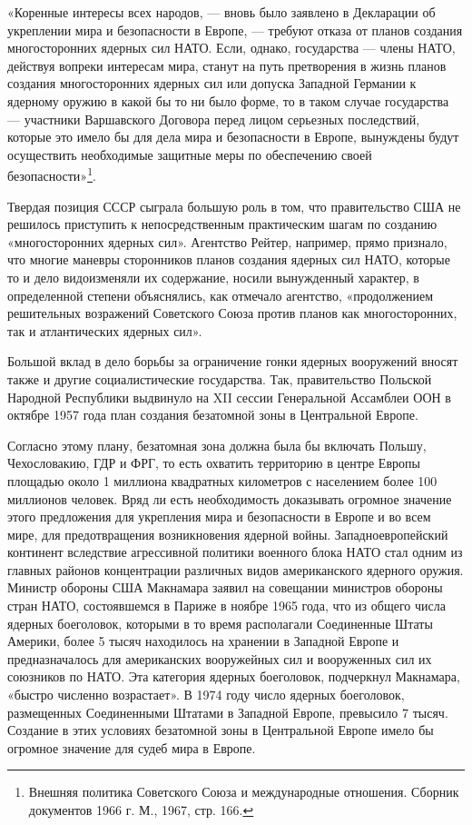 \documentclass[12pt, a4paper, openany]{book}
\begin{document}
	«Коренные интересы всех народов, — вновь было заявлено в Декларации об укреплении мира и безопасности в Европе, — требуют отказа от планов создания многосторонних ядерных сил НАТО. Если, однако, государства — члены НАТО, действуя вопреки интересам мира, станут на путь претворения в жизнь планов создания многосторонних ядерных сил или допуска Западной Германии к ядерному оружию в какой бы то ни было форме, то в таком случае государства — участники Варшавского Договора перед лицом серьезных последствий, которые это имело бы для дела мира и безопасности в Европе, вынуждены будут осуществить необходимые защитные меры по обеспечению своей безопасности»{\footnote{Внешняя политика Советского Союза и международные отношения. Сборник документов 1966 г. М., 1967, стр. 166.}}.
	
	
	Твердая позиция СССР сыграла большую роль в том, что правительство США не решилось приступить к непосредственным практическим шагам по созданию «многосторонних ядерных сил». Агентство Рейтер, например, прямо признало, что многие маневры сторонников планов создания ядерных сил НАТО, которые то и дело видоизменяли их содержание, носили вынужденный характер, в определенной степени объяснялись, как отмечало агентство, «продолжением решительных возражений Советского Союза против планов как многосторонних, так и атлантических ядерных сил».
	
	Большой вклад в дело борьбы за ограничение гонки ядерных вооружений вносят также и другие социалистические государства. Так, правительство Польской Народной Республики выдвинуло на XII сессии Генеральной Ассамблеи ООН в октябре 1957 года план создания безатомной зоны в Центральной Европе.
	
	Согласно этому плану, безатомная зона должна была бы включать Польшу, Чехословакию, ГДР и ФРГ, то есть охватить территорию в центре Европы площадью около 1 миллиона квадратных километров с населением более 100 миллионов человек. Вряд ли есть необходимость доказывать огромное значение этого предложения для укрепления мира и безопасности в Европе и во всем мире, для предотвращения возникновения ядерной войны. Западноевропейский континент вследствие агрессивной политики военного блока НАТО стал одним из главных районов концентрации различных видов американского ядерного оружия. Министр обороны США Макнамара заявил на совещании министров обороны стран НАТО, состоявшемся в Париже в ноябре 1965 года, что из общего числа ядерных боеголовок, которыми в то время располагали Соединенные Штаты Америки, более 5 тысяч находилось на хранении в Западной Европе и предназначалось для американских вооружейных сил и вооруженных сил их союзников по НАТО. Эта категория ядерных боеголовок, подчеркнул Макнамара, «быстро численно возрастает». В 1974 году число ядерных боеголовок, размещенных Соединенными Штатами в Западной Европе, превысило 7 тысяч. Создание в этих условиях безатомной зоны в Центральной Европе имело бы огромное значение для судеб мира в Европе.
	
\end{document}
